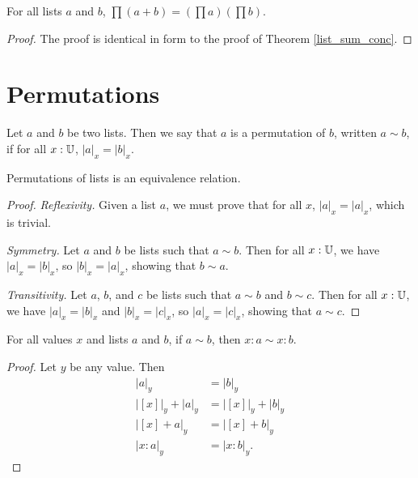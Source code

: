 \documentclass[../../math.tex]{subfiles}
\begin{document}
\begin{theorem} \label{list_prod_conc}
    For all lists $a$ and $b$, $\prod (a + b) = (\prod a) (\prod b)$.
\end{theorem}
\begin{proof}
    The proof is identical in form to the proof of Theorem \ref{list_sum_conc}.
\end{proof}

\section{Permutations}

\begin{definition}
    Let $a$ and $b$ be two lists.  Then we say that $a$ is a permutation of $b$,
    written $a \sim b$, if for all $x : \mathbb{U}$, $|a|_x = |b|_x$.
\end{definition}

\begin{instance}
    Permutations of lists is an equivalence relation.
\end{instance}
\begin{proof}
    \textit{Reflexivity.}  Given a list $a$, we must prove that for all $x$,
    $|a|_x = |a|_x$, which is trivial.

    \textit{Symmetry.}  Let $a$ and $b$ be lists such that $a \sim b$.  Then for
    all $x : \mathbb{U}$, we have $|a|_x = |b|_x$, so $|b|_x = |a|_x$, showing that $b
    \sim a$.

    \textit{Transitivity.} Let $a$, $b$, and $c$ be lists such that $a \sim b$
    and $b \sim c$.  Then for all $x : \mathbb{U}$, we have $|a|_x = |b|_x$ and $|b|_x =
    |c|_x$, so $|a|_x = |c|_x$, showing that $a \sim c$.
\end{proof}

\begin{theorem} \label{list_perm_skip}
    For all values $x$ and lists $a$ and $b$, if $a \sim b$, then $x : a \sim x
    : b$.
\end{theorem}
\begin{proof}
    Let $y$ be any value.  Then
    \begin{align*}
        |a|_y &= |b|_y \\
        |[x]|_y + |a|_y &= |[x]|_y + |b|_y \\
        |[x] + a|_y &= |[x] + b|_y \\
        |x : a|_y &= |x : b|_y.
    \end{align*}
\end{proof}
\end{document}
